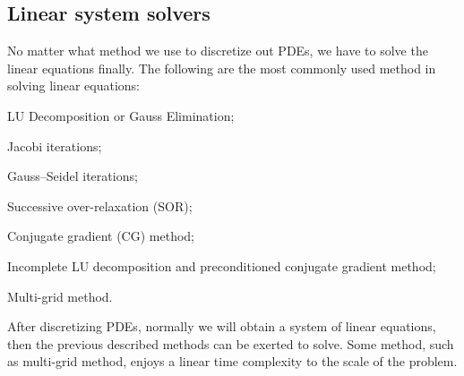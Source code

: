 \documentclass[english, nochinese]{pkupaper}
\begin{document}
\subsection{Linear system solvers}

No matter what method we use to discretize out PDEs, we have to solve the linear equations finally.
The following are the most commonly used method in solving linear equations:
\begin{partlist}
\item LU Decomposition or Gauss Elimination;
\item Jacobi iterations;
\item Gauss--Seidel iterations;
\item Successive over-relaxation (SOR);
\item Conjugate gradient (CG) method;
\item Incomplete LU decomposition and preconditioned conjugate gradient method;
\item Multi-grid method.
\end{partlist}

After discretizing PDEs, normally we will obtain a system of linear equations, then the previous described methods can be exerted to solve. Some method, such as multi-grid method, enjoys a linear time complexity to the scale of the problem.


\end{document}
